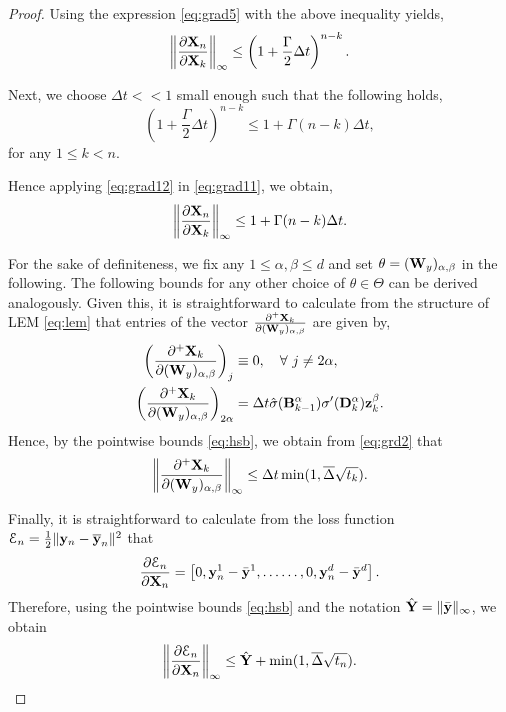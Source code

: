 \documentclass{article} \usepackage{iclr2022_conference,times}
\newcommand{\by}{{\bf y}}
\newcommand{\bz}{{\bf z}}
\newcommand{\bW}{{\bf W}}
\newcommand{\bX}{{\bf X}}
\newcommand{\bY}{{\bf Y}}
\newcommand{\bB}{{\bf B}}
\newcommand{\Dt}{{\Delta t}}
\newcommand{\E}{\EuScript{E}}
\newcommand{\bdel}{\overline{\Delta}}
\newcommand{\bD}{{\bf D}}
\begin{document}
\begin{proof}
Using the expression \eqref{eq:grad5} with the above inequality yields,
\begin{equation}
    \label{eq:grad11}
    \left \| \frac{\partial \bX_n}{\partial \bX_{k}}\right\|_{\infty} \leq \left(1 +  \frac{\Gamma}{2}\Dt \right)^{n-k} .
\end{equation}

Next, we choose $\Dt << 1$ small enough such that the following holds, 
\begin{equation}
\label{eq:grad12}
\left(1 +  \frac{\Gamma}{2}\Dt \right)^{n-k} \leq 1 + \Gamma(n-k)\Dt, 
\end{equation}
for any $1 \leq k < n$.

Hence applying \eqref{eq:grad12} in \eqref{eq:grad11}, we obtain,
\begin{equation}
    \label{eq:grd1}
     \left \| \frac{\partial \bX_n}{\partial \bX_{k}}\right\|_{\infty} \leq 1 + \Gamma(n-k)\Dt .
\end{equation}

For the sake of definiteness, we fix any $1 \leq \alpha,\beta \leq d$ and set $\theta = (\bW_y)_{\alpha,\beta}$ in the following. The following bounds for any other choice of $\theta \in \Theta$ can be derived analogously. Given this, it is straightforward to calculate from the structure of LEM \eqref{eq:lem} that entries of the vector $\frac{\partial^+\bX_k}{\partial (\bW_y)_{\alpha,\beta}}$ are given by,
\begin{equation}
    \label{eq:grd2}
    \begin{aligned}
    \left(\frac{\partial^+\bX_k}{\partial (\bW_y)_{\alpha,\beta}}\right)_{j} &\equiv 0, \quad \forall~j \neq 2\alpha, \\
\left(\frac{\partial^+\bX_k}{\partial (\bW_y)_{\alpha,\beta}}\right)_{2\alpha}&= \Dt \hat{\sigma}(\bB^\alpha_{k-1})\sigma^{\prime}(\bD^\alpha_{k})\bz^\beta_{k}.
    \end{aligned}
\end{equation}
Hence, by the pointwise bounds \eqref{eq:hsb}, we obtain from \eqref{eq:grd2} that
\begin{equation}
    \label{eq:grd3}
    \left\|\frac{\partial^+\bX_k}{\partial (\bW_y)_{\alpha,\beta}}\right\|_{\infty} \leq \Dt \min(1,\bdel\sqrt{t_k}) .
\end{equation}

Finally, it is straightforward to calculate from the loss function $\E_n = \frac{1}{2}\|\by_n - \overline{\by}_n\|^2$ that
\begin{equation}
    \label{eq:grd4}
    \frac{\partial \E_n}{\partial \bX_n}=  \left[0,\by_n^1-\bar{\by}^1,\ldots \ldots,0,\by_n^d-\bar{\by}^d\right].
\end{equation}
Therefore, using the pointwise bounds \eqref{eq:hsb} and the notation $\hat{\bY} = \|\bar{\by}\|_{\infty}$, we obtain
\begin{equation}
    \label{eq:grd5}
    \left\|\frac{\partial \E_n}{\partial \bX_n}\right\|_{\infty} \leq \hat{\bY} +  \min(1, \bdel \sqrt{t_n}). 
\end{equation}


\end{proof}
\end{document}

